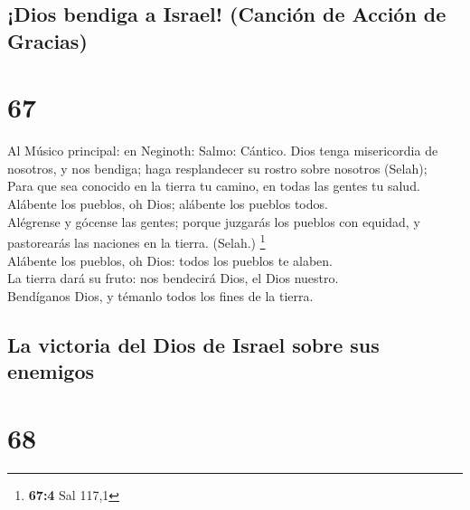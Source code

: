 \hypertarget{dios-bendiga-a-israel-canciuxf3n-de-acciuxf3n-de-gracias}{%
\subsection{¡Dios bendiga a Israel! (Canción de Acción de
Gracias)}\label{dios-bendiga-a-israel-canciuxf3n-de-acciuxf3n-de-gracias}}

\hypertarget{section-66}{%
\section{67}\label{section-66}}

 Al Músico principal: en Neginoth: Salmo: Cántico. Dios
tenga misericordia de nosotros, y nos bendiga; haga resplandecer su
rostro sobre nosotros (Selah);\\
 Para que sea conocido en la tierra tu camino, en todas las
gentes tu salud.\\
 Alábente los pueblos, oh Dios; alábente los pueblos
todos.\\
 Alégrense y gócense las gentes; porque juzgarás los pueblos
con equidad, y pastorearás las naciones en la tierra. (Selah.)
\footnote{\textbf{67:4} Sal 117,1}\\
 Alábente los pueblos, oh Dios: todos los pueblos te
alaben.\\
 La tierra dará su fruto: nos bendecirá Dios, el Dios
nuestro.\\
 Bendíganos Dios, y témanlo todos los fines de la tierra.

\hypertarget{la-victoria-del-dios-de-israel-sobre-sus-enemigos}{%
\subsection{La victoria del Dios de Israel sobre sus
enemigos}\label{la-victoria-del-dios-de-israel-sobre-sus-enemigos}}

\hypertarget{section-67}{%
\section{68}\label{section-67}}

